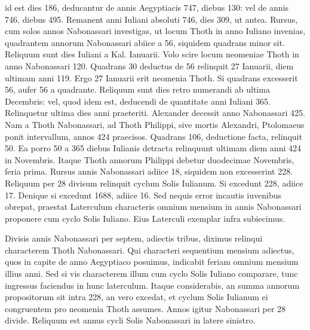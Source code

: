 id est dies 186, deducantur de annis Aegyptiacis 747, diebus 130:
vel de annis 746, diebus 495.
Remanent anni Iuliani absoluti 746,
dies 309, ut antea.
Rursus, cum solos annos Nabonassari investigas,
ut locum Thoth in anno Iuliano invenias, quadrantem annorum
Nabonassari abiice a 56, siquidem quadrans minor sit.
Reliquum
sunt dies Iuliani a Kal. Ianuarii.
Volo scire locum neomeniae Thoth
in anno Nabonassari 120.
Quadrans 30 deductus de 56 relinquit
27 Ianuarii, diem ultimam anni 119.
Ergo 27 Ianuarii erit neomenia
Thoth.
Si quadrans excesserit 56, aufer 56 a quadrante.
Reliquum
sunt dies retro numerandi ab ultima Decembris: vel, quod
idem est, deducendi de quantitate anni Iuliani 365.
Relinquetur ultima
dies anni praeteriti.
Alexander decessit anno Nabonassari 425.
Nam a Thoth Nabonassari, ad Thoth Philippi, sive mortis Alexandri,
Ptolomaeus ponit intervallum, annos 424 praecisos.
Quadrans
106, deductione facta, relinquit 50.
Ea porro 50 a 365
diebus Iulianis detracta relinquunt ultimam diem anni 424
in  Novembris.
Itaque Thoth annorum Philippi debetur
duodecimae Novembris, feria prima.
Rursus annis Nabonassari
adiice 18,
siquidem non excesserint 228.
Reliquum per 28
divisum relinquit cyclum Solis Iulianum.
Si excedunt 228, adiice
17.
Denique si excedunt 1688, adiice 16.
Sed nequis error
incautis iuvenibus obrepat, praestat Laterculum characteris omnium
mensium in annis Nabonassari proponere cum cyclo Solis
Iuliano.
%
Eius Laterculi exemplar infra subiecimus.
%
\begin{table}[tbp]
  
\end{table}
%
Divisis annis
Nabonassari per septem, adiectis tribus, diximus relinqui characterem
Thoth Nabonassari.
Qui characteri sequentium mensium adiectus,
quos in capite de anno Aegyptiaco posuimus, indicabit feriam omnium
mensium illius anni.
Sed si vis characterem illum cum cyclo
Solis Iuliano comparare, tunc ingressus faciendus in hunc laterculum.
Itaque considerabis, an summa annorum propositorum sit intra
228, an vero excedat, et cyclum Solis Iulianum ei congruentem
pro neomenia Thoth assumes.
Annos igitur Nabonassari per 28 divide.
Reliquum est annus cycli Solis Nabonassari in latere sinistro.
